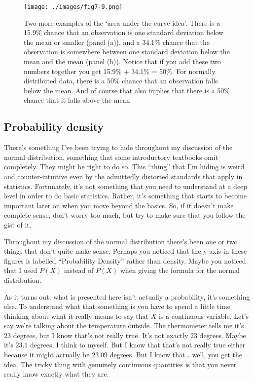 \documentclass[
  letterpaper,
]{book}
\begin{document}
\begin{figure}

\texttt{[image: ./images/fig7-9.png]} \hfill{}

\caption{\label{fig-fig7-9}Two more examples of the `area under the
curve idea'. There is a 15.9\% chance that an observation is one
standard deviation below the mean or smaller (panel (a)), and a 34.1\%
chance that the observation is somewhere between one standard deviation
below the mean and the mean (panel (b)). Notice that if you add these
two numbers together you get 15.9\% + 34.1\% = 50\%. For normally
distributed data, there is a 50\% chance that an observation falls below
the mean. And of course that also implies that there is a 50\% chance
that it falls above the mean}

\end{figure}

\hypertarget{probability-density}{%
\subsection{Probability density}\label{probability-density}}

There's something I've been trying to hide throughout my discussion of
the normal distribution, something that some introductory textbooks omit
completely. They might be right to do so. This ``thing'' that I'm hiding
is weird and counter-intuitive even by the admittedly distorted
standards that apply in statistics. Fortunately, it's not something that
you need to understand at a deep level in order to do basic statistics.
Rather, it's something that starts to become important later on when you
move beyond the basics. So, if it doesn't make complete sense, don't
worry too much, but try to make sure that you follow the gist of it.

Throughout my discussion of the normal distribution there's been one or
two things that don't quite make sense. Perhaps you noticed that the
y-axis in these figures is labelled ``Probability Density'' rather than
density. Maybe you noticed that I used \(P(X)\) instead of \(P(X)\) when
giving the formula for the normal distribution.

As it turns out, what is presented here isn't actually a probability,
it's something else. To understand what that something is you have to
spend a little time thinking about what it really means to say that
\(X\) is a continuous variable. Let's say we're talking about the
temperature outside. The thermometer tells me it's \(23\) degrees, but I
know that's not really true. It's not exactly \(23\) degrees. Maybe it's
\(23.1\) degrees, I think to myself. But I know that that's not really
true either because it might actually be \(23.09\) degrees. But I know
that\ldots{} well, you get the idea. The tricky thing with genuinely
continuous quantities is that you never really know exactly what they
are.
\end{document}
